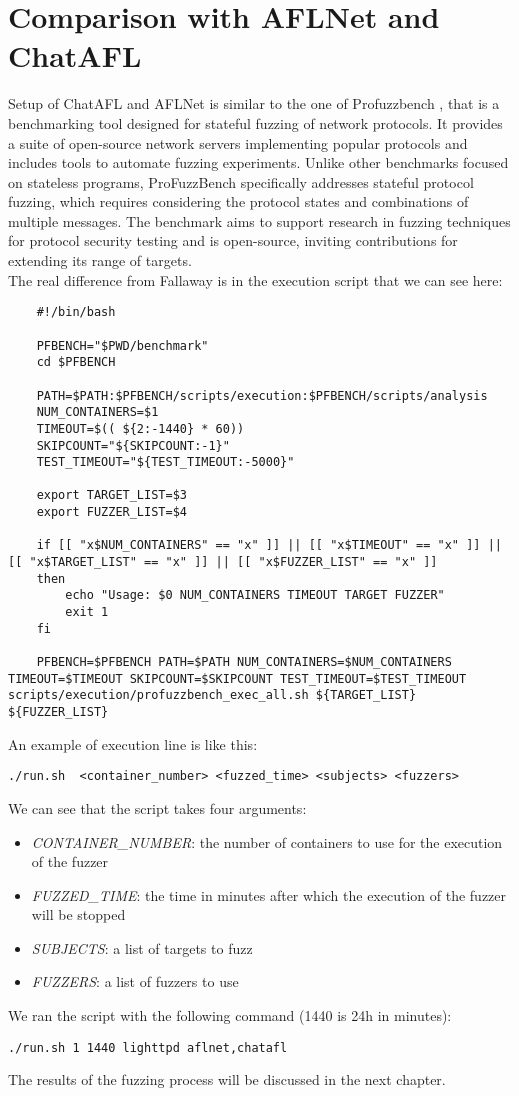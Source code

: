 \chapter{Comparison with AFLNet and ChatAFL}

Setup of ChatAFL and AFLNet is similar to the one of Profuzzbench \cite{profuzzbench}, that is a benchmarking tool designed for stateful fuzzing of network protocols. It provides a suite of open-source network servers implementing popular protocols and includes tools to automate fuzzing experiments. Unlike other benchmarks focused on stateless programs, ProFuzzBench specifically addresses stateful protocol fuzzing, which requires considering the protocol states and combinations of multiple messages. The benchmark aims to support research in fuzzing techniques for protocol security testing and is open-source, inviting contributions for extending its range of targets.
\\The real difference from Fallaway is in the execution script that we can see here:
\begin{lstlisting}
    #!/bin/bash

    PFBENCH="$PWD/benchmark"
    cd $PFBENCH

    PATH=$PATH:$PFBENCH/scripts/execution:$PFBENCH/scripts/analysis
    NUM_CONTAINERS=$1
    TIMEOUT=$(( ${2:-1440} * 60))
    SKIPCOUNT="${SKIPCOUNT:-1}"
    TEST_TIMEOUT="${TEST_TIMEOUT:-5000}"

    export TARGET_LIST=$3
    export FUZZER_LIST=$4

    if [[ "x$NUM_CONTAINERS" == "x" ]] || [[ "x$TIMEOUT" == "x" ]] || [[ "x$TARGET_LIST" == "x" ]] || [[ "x$FUZZER_LIST" == "x" ]]
    then
        echo "Usage: $0 NUM_CONTAINERS TIMEOUT TARGET FUZZER"
        exit 1
    fi

    PFBENCH=$PFBENCH PATH=$PATH NUM_CONTAINERS=$NUM_CONTAINERS TIMEOUT=$TIMEOUT SKIPCOUNT=$SKIPCOUNT TEST_TIMEOUT=$TEST_TIMEOUT scripts/execution/profuzzbench_exec_all.sh ${TARGET_LIST} ${FUZZER_LIST}
\end{lstlisting}
An example of execution line is like this:
\begin{lstlisting}
./run.sh  <container_number> <fuzzed_time> <subjects> <fuzzers>
\end{lstlisting}
We can see that the script takes four arguments:
\begin{itemize}
    \item \textit{CONTAINER\_NUMBER}: the number of containers to use for the execution of the fuzzer
    \item \textit{FUZZED\_TIME}: the time in minutes after which the execution of the fuzzer will be stopped
    \item \textit{SUBJECTS}: a list of targets to fuzz
    \item \textit{FUZZERS}: a list of fuzzers to use
\end{itemize}
We ran the script with the following command (1440 is 24h in minutes):
\begin{lstlisting}
./run.sh 1 1440 lighttpd aflnet,chatafl
\end{lstlisting}
The results of the fuzzing process will be discussed in the next chapter.